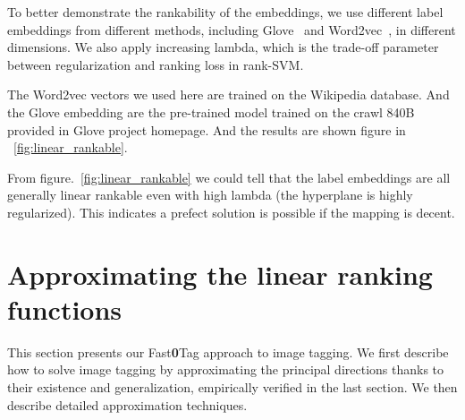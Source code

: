 \documentclass[10pt,twocolumn,letterpaper]{article}
\newcommand{\eat}[1]{{}}
\begin{document}
{To better demonstrate the rankability of the embeddings, we use different label embeddings from different methods, including Glove~\cite{pennington_glove:_2014} and Word2vec~\cite{mikolov_linguistic_2013,mikolov_distributed_2013,mikolov_efficient_2013}, in different dimensions. We also apply increasing lambda, which is the trade-off parameter between regularization and ranking loss in rank-SVM.

The Word2vec vectors we used here are trained on the Wikipedia database. And the Glove embedding are the pre-trained model trained on the crawl 840B provided in Glove project homepage. And the results are shown figure in ~\ref{fig:linear_rankable}.

From figure.~\ref{fig:linear_rankable} we could tell that the label embeddings are all generally linear rankable even with high lambda (the hyperplane is highly regularized). This indicates a prefect solution is possible if the mapping  is decent.
}






\eat{
For the second perspective, we tested our hyperplanes trained in the aforementioned experiment on an additional unseen 81 labels annotated on the validation set. The 925 labels in the previous experiment and the 81 labels used here are mutually exclusive. In another word, we are predicting ranks of labels based on some other disjoint labels only. This is similar to tag completion task without using images. This sanity check would reveal how relatively generalized the word embedding could be and how correlated the tags are. And the results are shown figure in ~\ref{fig:linear_generalization}.

We could see from both figures that the linear rankability and predictability are directly correlated to the dimensionality of the word embedding even they are trained on the same text corpus.

We could draw at least two conclusions from figure.~\ref{fig:linear_generalization}. First is that word embedding could be an efficient media for us to transfer knowledge from seen tags to the task of ranking and predicting unseen tags. Second is that although technically they should be independent events, different tags are so statistically correlated that we could predict image tags even without seeing any images or modeling tagging like TagCooccur~\cite{sigurbjornsson_flickr_2008}.
}
 \section{Approximating the linear ranking functions}
\label{sApproach}
This section presents our Fast\textbf{0}Tag approach to image tagging. We first describe how to solve image tagging by approximating the principal directions thanks to their existence and generalization, empirically verified in the last section. We then describe  detailed approximation techniques.
\end{document}
